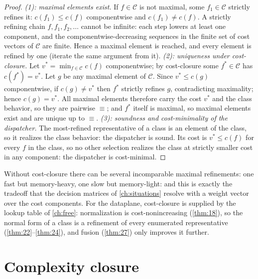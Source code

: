 \begin{proof}
\emph{(1): maximal elements exist.} If $f \in \mathcal{C}$ is not maximal, some
$f_1 \in \mathcal{C}$ strictly refines it: $c (f_1) \le c (f)$ componentwise and
$c (f_1) \neq c (f)$. A strictly refining chain
$f, f_1, f_2, \dots$ cannot be infinite: each step lowers at least one
component, and the componentwise-decreasing sequences in the finite set of
cost vectors of $\mathcal{C}$ are finite. Hence a maximal element is reached,
and every element is refined by one (iterate the same argument from it).
\emph{(2): uniqueness under cost-closure.} Let
$v^{*} = \min_{f \in \mathcal{C}} c (f)$ componentwise; by cost-closure some
$f^{*} \in \mathcal{C}$ has $c (f^{*}) = v^{*}$. Let $g$ be any maximal element
of $\mathcal{C}$. Since $v^{*} \le c (g)$ componentwise, if $c (g) \neq v^{*}$
then $f^{*}$ strictly refines $g$, contradicting maximality; hence
$c (g) = v^{*}$. All maximal elements therefore carry the cost $v^{*}$ and the
class behavior, so they are pairwise $\equiv$; and $f^{*}$ itself is maximal,
so maximal elements exist and are unique up to $\equiv$.
\emph{(3): soundness and cost-minimality of the dispatcher.} The most-refined
representative of a class is an element of the class, so it realizes the class
behavior: the dispatcher is sound. Its cost is $v^{*} \le c (f)$ for every
$f$ in the class, so no other selection realizes the class at strictly
smaller cost in any component: the dispatcher is cost-minimal.
\end{proof}

\begin{remark}
Without cost-closure there can be several incomparable maximal refinements:
one fast but memory-heavy, one slow but memory-light: and this is exactly
the tradeoff that the decision matrices of \autoref{ch:situations} resolve
with a weight vector over the cost components. For the dataplane,
cost-closure is supplied by the lookup table of \autoref{ch:free}:
normalization is cost-nonincreasing (\autoref{thm:18}), so the normal form of a class is a
refinement of every enumerated representative (\autoref{thm:22}--\autoref{thm:24}), and fusion (\autoref{thm:27})
only improves it further.
\end{remark}

\section{Complexity closure}\label{sec:enrich-closure}

